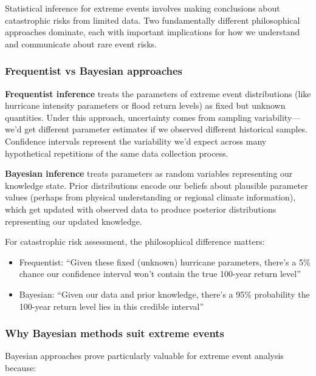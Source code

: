 \documentclass[
  letterpaper,
  DIV=11,
  numbers=noendperiod]{scrreprt}
\providecommand{\tightlist}{%
  \setlength{\itemsep}{0pt}\setlength{\parskip}{0pt}}
\begin{document}
Statistical inference for extreme events involves making conclusions
about catastrophic risks from limited data. Two fundamentally different
philosophical approaches dominate, each with important implications for
how we understand and communicate about rare event risks.

\subsubsection{Frequentist vs Bayesian
approaches}\label{frequentist-vs-bayesian-approaches}

\textbf{Frequentist inference} treats the parameters of extreme event
distributions (like hurricane intensity parameters or flood return
levels) as fixed but unknown quantities. Under this approach,
uncertainty comes from sampling variability---we'd get different
parameter estimates if we observed different historical samples.
Confidence intervals represent the variability we'd expect across many
hypothetical repetitions of the same data collection process.

\textbf{Bayesian inference} treats parameters as random variables
representing our knowledge state. Prior distributions encode our beliefs
about plausible parameter values (perhaps from physical understanding or
regional climate information), which get updated with observed data to
produce posterior distributions representing our updated knowledge.

For catastrophic risk assessment, the philosophical difference matters:

\begin{itemize}
\tightlist
\item
  Frequentist: ``Given these fixed (unknown) hurricane parameters,
  there's a 5\% chance our confidence interval won't contain the true
  100-year return level''
\item
  Bayesian: ``Given our data and prior knowledge, there's a 95\%
  probability the 100-year return level lies in this credible interval''
\end{itemize}

\subsubsection{Why Bayesian methods suit extreme
events}\label{why-bayesian-methods-suit-extreme-events}

Bayesian approaches prove particularly valuable for extreme event
analysis because:
\end{document}
